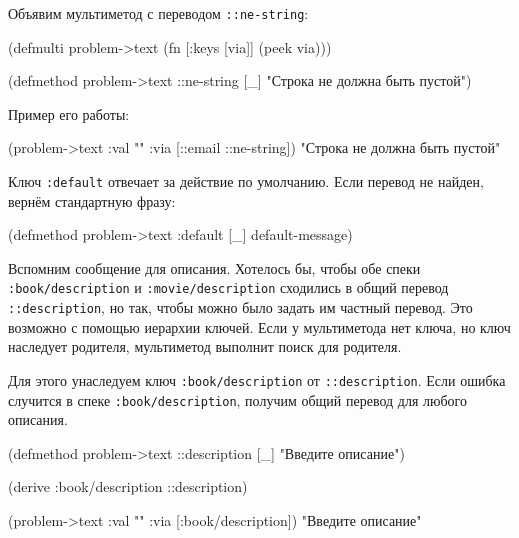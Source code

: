 Объявим мультиметод с переводом \verb|::ne-string|:


  \begin{clojure}
(defmulti problem->text
  (fn [{:keys [via]}]
    (peek via)))

(defmethod problem->text ::ne-string [_]
  "Строка не должна быть пустой")
  \end{clojure}

\noindent
Пример его работы:

  \begin{clojure}
(problem->text {:val "" :via [::email ::ne-string]})
"Строка не должна быть пустой"
  \end{clojure}

Ключ \verb|:default| отвечает за действие по умолчанию. Если перевод не
найден, вернём стандартную фразу:

\begin{english}
  \begin{clojure}
(defmethod problem->text :default [_]
  default-message)
  \end{clojure}
\end{english}


Вспомним сообщение для описания. Хотелось бы, чтобы обе спеки
\verb|:book/description| и \verb|:movie/description| сходились в общий перевод
\verb|::description|, но так, чтобы можно было задать им частный перевод. Это
возможно с помощью иерархии ключей. Если у мультиметода нет ключа, но ключ
наследует родителя, мультиметод выполнит поиск для родителя.

Для этого унаследуем ключ \verb|:book/description| от
\verb|::description|. Если ошибка случится в спеке \verb|:book/description|,
получим общий перевод для любого описания.


  \begin{clojure}
(defmethod problem->text ::description [_]
  "Введите описание")

(derive :book/description ::description)

(problem->text {:val "" :via [:book/description]})
"Введите описание"
  \end{clojure}

